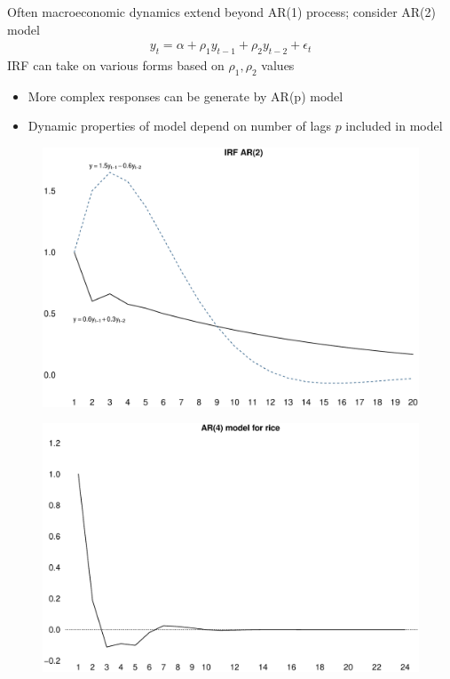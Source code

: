 \documentclass{beamer}
\begin{document}
\begin{frame}
  Often macroeconomic dynamics extend beyond AR(1) process; consider AR(2) model
  \begin{align}
  y_t = \alpha + \rho_1 y_{t-1} + \rho_2 y_{t-2} + \epsilon_t
  \end{align}
  \medskip
  IRF can take on various forms based on $\rho_1,\rho_2$ values
  \begin{itemize}
    \item More complex responses can be generate by AR(p) model
    \item Dynamic properties of model depend on number of lags $p$ included in model
  \end{itemize}
\end{frame}

\begin{frame}
  \begin{figure}
    \includegraphics[scale=.3]{irf_ar2.eps}
  \end{figure}
\end{frame}

\begin{frame}
  \begin{figure}
    \includegraphics[scale=.3]{rice4.eps}
  \end{figure}
\end{frame}
\end{document}

